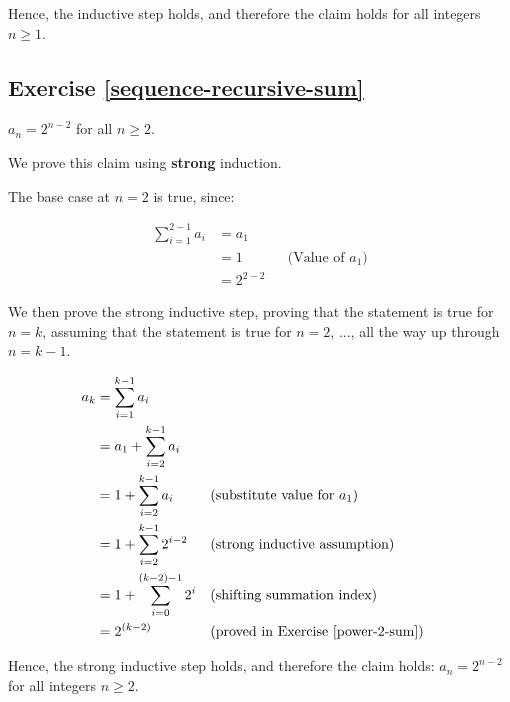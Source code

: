 \documentclass{article}
\begin{document}
Hence, the inductive step holds, and therefore the claim holds for all integers $n \geq 1$. 

\subsection{Exercise \ref{sequence-recursive-sum}}

$a_n = 2^{n-2}$ for all $n \geq 2$. 


We prove this claim using \textbf{strong} induction. 

The base case at $n = 2$ is true, since:

\begin{align*}
\sum_{i=1}^{2-1} a_i &= a_1 \\
&= 1 && \text{(Value of $a_1$)} \\
&= 2^{2-2}
\end{align*}

We then prove the strong inductive step, proving that the statement is true for $n = k$, assuming that the statement is true for $n = 2$, ..., all the way up through $n = k - 1$.

\begin{align*}
a_k &= \sum_{i=1}^{k-1} a_i \\
&= a_1 + \sum_{i=2}^{k-1} a_i \\
&= 1 + \sum_{i=2}^{k-1} a_i && \text{(substitute value for $a_1$)} \\
&= 1 + \sum_{i=2}^{k-1} 2^{i-2} && \text{(strong inductive assumption)} \\
&= 1 + \sum_{i=0}^{(k-2)-1} 2^i && \text{(shifting summation index)} \\
&= 2^{(k-2)} && \text{(proved in Exercise \ref{power-2-sum})}
\end{align*}

Hence, the strong inductive step holds, and therefore the claim holds: $a_n = 2^{n-2}$ for all integers $n \geq 2$. 
\end{document}
